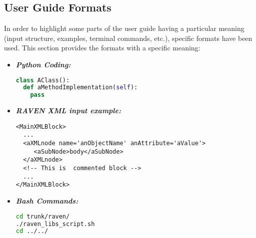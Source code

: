 \subsection{User Guide Formats}
In order to highlight some parts of the user guide having a particular meaning (input structure, examples, terminal commands, etc.), specific formats have been used. This section provides the formats with a specific meaning:
\begin{itemize}
\item \textbf{\textit{Python Coding:}}
\begin{lstlisting}[language=python]
class AClass():
  def aMethodImplementation(self):
    pass
\end{lstlisting}
\item \textbf{\textit{RAVEN XML input example:}}
\begin{lstlisting}[style=XML,morekeywords={anAttribute}]
<MainXMLBlock>
  ...
  <aXMLnode name='anObjectName' anAttribute='aValue'>
     <aSubNode>body</aSubNode>
  </aXMLnode>
  <!-- This is  commented block -->
  ...
</MainXMLBlock>
\end{lstlisting}
\item \textbf{\textit{Bash Commands:}}
\begin{lstlisting}[language=bash]
cd trunk/raven/
./raven_libs_script.sh
cd ../../
\end{lstlisting}
\end{itemize}

